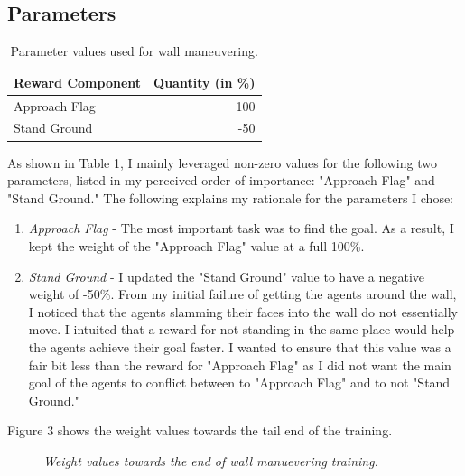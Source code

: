 \documentclass{article} %
\begin{document}
\subsection{Parameters}

\begin{table}[H]
\centering
\begin{tabular}{l|r}
Reward Component & Quantity (in \%) \\\hline
Approach Flag & 100 \\
Stand Ground & -50
\end{tabular}
\caption{\label{tab:widgets}Parameter values used for wall maneuvering.}
\end{table}
As shown in Table 1, I mainly leveraged non-zero values for the following two parameters, listed in my perceived order of importance: "Approach Flag" and "Stand Ground." The following explains my rationale for the parameters I chose:

\begin{enumerate}
\item \textit{Approach Flag} - The most important task was to find the goal. As a result, I kept the weight of the "Approach Flag" value at a full 100\%.
\item \textit{Stand Ground} - I updated the "Stand Ground" value to have a negative weight of -50\%. From my initial failure of getting the agents around the wall, I noticed that the agents slamming their faces into the wall do not essentially move. I intuited that a reward for not standing in the same place would help the agents achieve their goal faster. I wanted to ensure that this value was a fair bit less than the reward for "Approach Flag" as I did not want the main goal of the agents to conflict between to "Approach Flag" and to not "Stand Ground."
\end{enumerate} 

Figure 3 shows the weight values towards the tail end of the training.

\begin{figure}[H]%
	\centering
    	\hfill%
    \caption{\textit{Weight values towards the end of wall manuevering training.}}
    \label{fig:default}
\end{figure} 
\end{document}
